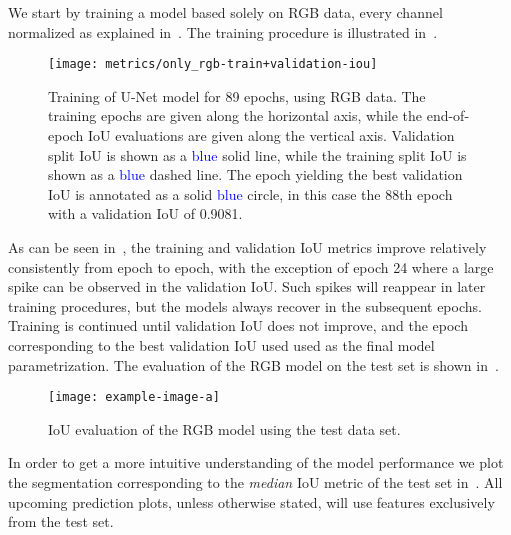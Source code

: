 We start by training a model based solely on RGB data, every channel normalized as explained in~.
The training procedure is illustrated in~.

\begin{figure}[H]
  \centering
  \texttt{[image: metrics/only\_rgb-train+validation-iou]}
  \caption{%
    Training of U-Net model for 89 epochs, using RGB data.
    The training epochs are given along the horizontal axis, while the end-of-epoch IoU evaluations are given along the vertical axis.
    Validation split IoU is shown as a \textcolor{blue}{blue} solid line, while the training split IoU is shown as a \textcolor{blue}{blue} dashed line.
    The epoch yielding the best validation IoU is annotated as a solid \textcolor{blue}{blue} circle, in this case the 88th epoch with a validation IoU of \num{0.9081}.
  }%
  \label{fig:rgb-training}
\end{figure}

As can be seen in~, the training and validation IoU metrics improve relatively consistently from epoch to epoch, with the exception of epoch 24 where a large spike can be observed in the validation IoU.
Such spikes will reappear in later training procedures, but the models always recover in the subsequent epochs.
Training is continued until validation IoU does not improve, and the epoch corresponding to the best validation IoU used used as the final model parametrization.
The evaluation of the RGB model on the test set is shown in~.

\begin{figure}[H]
  \centering
  \texttt{[image: example-image-a]}
  \caption{%
    IoU evaluation of the RGB model using the test data set.
  }%
  \label{fig:rgb-model-test}
\end{figure}

In order to get a more intuitive understanding of the model performance we plot the segmentation corresponding to the \textit{median} IoU metric of the test set in~.
All upcoming prediction plots, unless otherwise stated, will use features exclusively from the test set.

